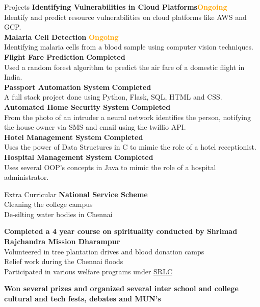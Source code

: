 \documentclass{resume}
\begin{document}
\begin{rSection}{Projects}
{\bf Identifying Vulnerabilities in Cloud  Platforms}\hfill{\textbf{\textcolor{Orange}{Ongoing}}}\\
Identify and predict resource vulnerabilities on cloud platforms like AWS and GCP.\\
{\bf Malaria Cell Detection} \hfill{\textbf{\textcolor{Orange}{Ongoing}}}\\
Identifying malaria cells from a blood sample using computer vision techniques.\\
{\bf Flight Fare Prediction} \hfill{\textbf{\textcolor{OliveGreen}{Completed}}}\\
Used a random forest algorithm to predict the air fare of a domestic flight in India.\\
{\bf Passport Automation System} \hfill{\textbf{\textcolor{OliveGreen}{Completed}}}\\
A full stack project done using Python, Flask, SQL, HTML and CSS.\\
{\bf Automated Home Security System} \hfill{\textbf{\textcolor{OliveGreen}{Completed}}}\\
From the photo of an intruder a neural network identifies the person, notifying the house owner via SMS and email using the twillio API.\\
{\bf Hotel Management System} \hfill{\textbf{\textcolor{OliveGreen}{Completed}}} \\
Uses the power of Data Structures in C to mimic the role of a hotel receptionist. \\
{\bf Hospital Management System} \hfill{\textbf{\textcolor{OliveGreen}{Completed}}}\\
Uses several OOP's concepts in Java to mimic the role of a hospital administrator.
\end{rSection}

\begin{rSection}{Extra Curricular} 
{\bf National Service Scheme}\\
Cleaning the college campus\\
De-silting water bodies in Chennai

{\bf Completed a 4 year course on spirituality conducted by Shrimad Rajchandra Mission Dharampur}\\
{Volunteered in tree plantation drives and blood donation camps}\\
{Relief work during the Chennai floods}\\
{Participated in various welfare programs under \href{https://www.srloveandcare.org/}{SRLC} }

{\bf Won several prizes and organized several inter school and college cultural and tech fests, debates and MUN's}
\end{rSection}
\end{document}
